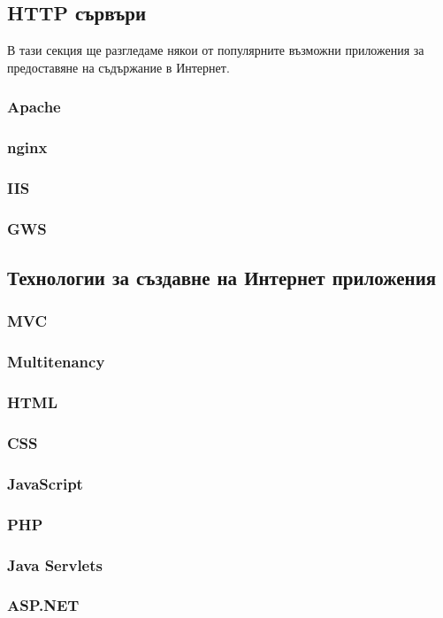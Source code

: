 \documentclass[pdftex,12pt,a4paper]{report}
\begin{document}
\subsection {HTTP сървъри}
В тази секция ще разгледаме някои от популярните възможни приложения за предоставяне на съдържание в Интернет.
\subsubsection {Apache}
\subsubsection {nginx}
\subsubsection {IIS}
\subsubsection {GWS}
\subsection {Технологии за създавне на Интернет приложения}
\subsubsection {MVC}
\subsubsection {Multitenancy}
\subsubsection {HTML}
\subsubsection {CSS}
\subsubsection {JavaScript}
\subsubsection {PHP}
\subsubsection {Java Servlets}
\subsubsection {ASP.NET}
\end{document}
